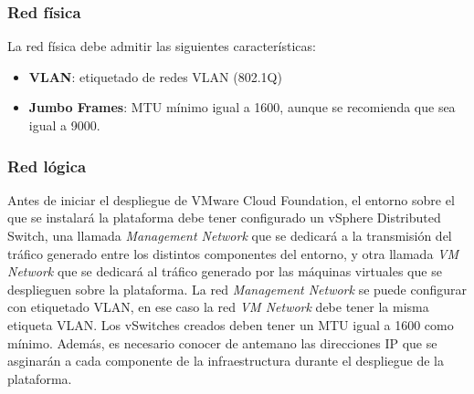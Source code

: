 \subsubsection{Red física}
\label{subsubsec:redFisica}
La red física debe admitir las siguientes características:
\begin{itemize}
    \item \textbf{VLAN}: etiquetado de redes VLAN (802.1Q)
    \item \textbf{Jumbo Frames}: MTU mínimo igual a 1600, aunque se recomienda que sea igual a 9000.
\end{itemize}

\subsubsection{Red lógica}
\label{subsubsec:redLogicaCF}

Antes de iniciar el despliegue de VMware Cloud Foundation, el entorno sobre el que se instalará la plataforma debe tener configurado un vSphere Distributed Switch, una llamada \textit{Management Network} que se dedicará a la transmisión del tráfico generado entre los distintos componentes del entorno, y otra llamada \textit{VM Network} que se dedicará al tráfico generado por las máquinas virtuales que se desplieguen sobre la plataforma. La red \textit{Management Network} se puede configurar con etiquetado VLAN, en ese caso la red \textit{VM Network} debe tener la misma etiqueta VLAN. Los vSwitches creados deben tener un MTU igual a 1600 como mínimo. Además, es necesario conocer de antemano las direcciones IP que se asginarán a cada componente de la infraestructura durante el despliegue de la plataforma.


